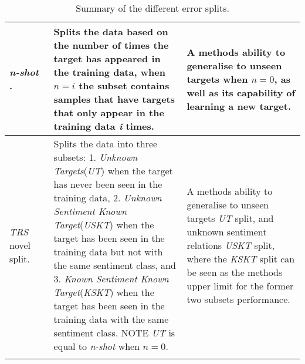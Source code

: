 \begin{longtable}{|p{0.15\linewidth}|p{0.45\linewidth}|p{0.4\linewidth}|}
\hline
\textit{n-shot} \citep{aug_yang2018multi}. & Splits the data based on the number of times the target has appeared in the training data, when $n=i$ the subset contains samples that have targets that only appear in the training data \textit{i} times. & A methods ability to generalise to unseen targets when $n=0$, as well as its capability of learning a new target. \\
\hline
\textit{TRS} novel split. & Splits the data into three subsets: 1. \textit{Unknown Targets}(\textit{UT}) when the target has never been seen in the training data, 2. \textit{Unknown Sentiment Known Target}(\textit{USKT}) when the target has been seen in the training data but not with the same sentiment class, and 3. \textit{Known Sentiment Known Target}(\textit{KSKT}) when the target has been seen in the training data with the same sentiment class. NOTE \textit{UT} is equal to \textit{n-shot} when $n=0$. & A methods ability to generalise to unseen targets \textit{UT} split, and unknown sentiment relations \textit{USKT} split, where the \textit{KSKT} split can be seen as the methods upper limit for the former two subsets performance. \\
\hline
\caption{Summary of the different error splits.}
\label{table:aug_error_split_summary}
\end{longtable}